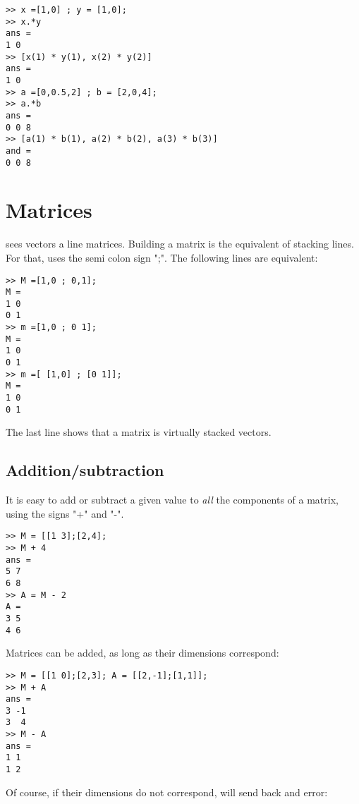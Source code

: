 \begin{lstlisting}
>> x =[1,0] ; y = [1,0];
>> x.*y
ans = 
1 0
>> [x(1) * y(1), x(2) * y(2)]
ans =
1 0
>> a =[0,0.5,2] ; b = [2,0,4];
>> a.*b
ans = 
0 0 8
>> [a(1) * b(1), a(2) * b(2), a(3) * b(3)]
and =
0 0 8
\end{lstlisting}





\section{Matrices}
\matlab sees vectors a line matrices. Building a matrix is the equivalent of stacking lines.
For that, \matlab uses the semi colon sign ";".
The following lines are equivalent:
\begin{lstlisting}
>> M =[1,0 ; 0,1];
M = 
1 0
0 1
>> m =[1,0 ; 0 1];
M = 
1 0
0 1
>> m =[ [1,0] ; [0 1]];
M = 
1 0
0 1
\end{lstlisting}

The last line shows that a matrix is virtually stacked vectors.


\subsection{Addition/subtraction}
It is easy to add or subtract a given value to \emph{all} the components of a matrix, using the signs "+" and "-".

\begin{lstlisting}
>> M = [[1 3];[2,4];
>> M + 4
ans =
5 7
6 8
>> A = M - 2
A =
3 5
4 6
\end{lstlisting}


Matrices can be added, as long as their dimensions correspond:

\begin{lstlisting}
>> M = [[1 0];[2,3]; A = [[2,-1];[1,1]];
>> M + A
ans =
3 -1
3  4
>> M - A
ans =
1 1
1 2
\end{lstlisting}

Of course, if their dimensions do not correspond, \matlab will send back and error:

